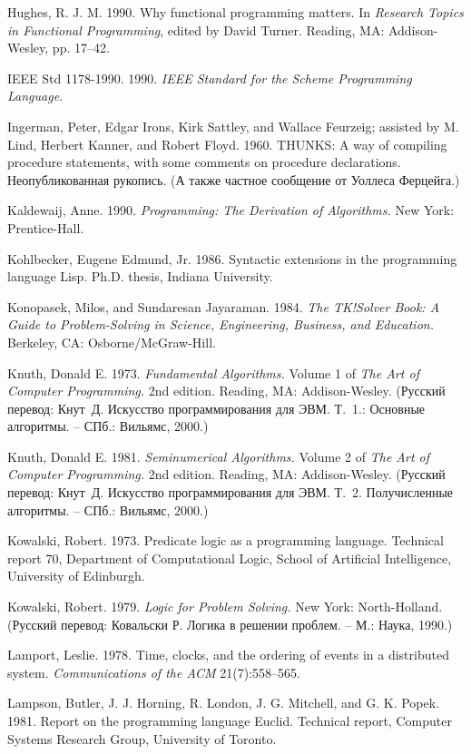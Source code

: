 {Hughes, R. J. M.  1990.  Why functional programming matters.  In {\em Research Topics in Functional Programming}, edited by David Turner.
Reading, MA: Addison-Wesley, pp. 17--42.

IEEE Std 1178-1990.  1990.  {\em IEEE Standard for the Scheme
Programming Lan\-gu\-age.}

Ingerman, Peter, Edgar Irons, Kirk Sattley, and Wallace Feurzeig;
assisted by M. Lind, Herbert Kanner, and Robert Floyd.  1960.  THUNKS:
A way of compiling procedure statements, with some comments on
procedure declarations.  Неопубликованная рукопись.  (А также частное
сообщение от Уоллеса Ферцейга.)

Kaldewaij, Anne. 1990.  {\em Programming: The Derivation of
Algorithms.} New York: Prentice-Hall.

Kohlbecker, Eugene Edmund, Jr. 1986.  Syntactic extensions in the
programming language Lisp.  Ph.D. thesis, Indiana University.

Konopasek, Milos, and Sundaresan Jayaraman.  1984.  {\em The TK!Solver
Book: A Guide to Problem-Solving in Science, Engineering, Business,
and Education.} Ber\-ke\-ley, CA: Osborne/McGraw-Hill.

Knuth, Donald E.  1973.  {\em Fundamental Algorithms.} Volume 1 of
{\em The Art of Compu\-ter Programming.}  2nd edition. Reading, MA:
Addison-Wesley. (Русский перевод: Кнут~Д. Искусство
программирования для ЭВМ. Т.~1.: Основные алгоритмы. -- СПб.: Вильямс, 2000.) 

Knuth, Donald E.  1981.  {\em Seminumerical Algorithms.} Volume 2 of
{\em The Art of Computer Programming.}  2nd edition. Reading, MA:
Addison-Wesley. (Русский перевод: Кнут~Д. Искусство
программирования для ЭВМ. Т.~2. Получисленные алгоритмы. -- СПб.: Вильямс, 2000.)

Kowalski, Robert.  1973.  Predicate logic as a programming language.
Technical report 70, Department of Computational Logic, School of
Artificial Intelligence, University of Edinburgh.

Kowalski, Robert.  1979.  {\em Logic for Problem Solving.} New York:
North-Holland. (Русский перевод: Ковальски Р. Логика в решении
проблем. -- М.: Наука, 1990.)

Lamport, Leslie. 1978.  Time, clocks, and the ordering of events in a
distributed system.  {\em Communications of the ACM} 21(7):558--565.

Lampson, Butler, J. J. Horning, R.  London, J. G. Mitchell, and G. K.
Popek.  1981.  Report on the programming language Euclid.  Technical
report, Computer Systems Research Group, University of Toronto.

}
